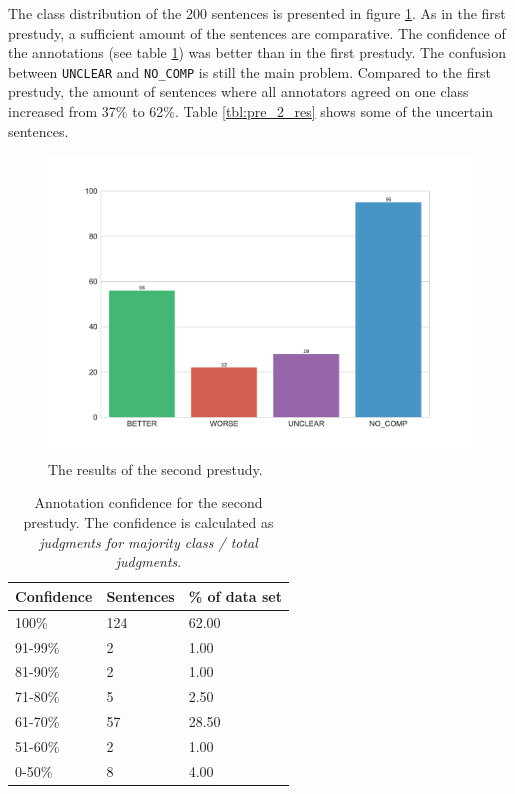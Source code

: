 The class distribution of the 200 sentences is presented in figure \ref{fig:dist_pre_b}.  As in the first prestudy, a sufficient amount of the sentences are comparative. The confidence of the annotations (see table \ref{tbl:pre_b_agg}) was better than in the first prestudy. The confusion between \texttt{UNCLEAR} and \texttt{NO\_COMP} is still the main problem. Compared to the first prestudy, the amount of sentences where all annotators agreed on one class increased from 37\% to 62\%. Table \ref{tbl:pre_2_res} shows some of the uncertain sentences.


\begin{figure}[b]
\centering
\caption{The results of the second prestudy.}
\label{fig:dist_pre_b}
\includegraphics[width=1\linewidth]{images/dataset/preb-dist}
\end{figure}


\begin{table}[tp]
\caption{Annotation confidence for the second prestudy. The confidence is calculated as \emph{judgments for majority class / total judgments}.}
\label{tbl:pre_b_agg}
\begin{tabularx}{\textwidth}{XXX}
\toprule
Confidence & Sentences & \% of data set \\
\midrule
100\%	&	124	&	62.00	 \\ 
91-99\%	&	2	&	1.00	 \\ 
81-90\%	&	2	&	1.00	 \\ 
71-80\%	&	5	&	2.50	 \\ 
61-70\%	&	57	&	28.50	 \\ 
51-60\%	&	2	&	1.00	 \\ 
0-50\%	&	8	&	4.00	 \\ 
\bottomrule
\end{tabularx}
\end{table}



